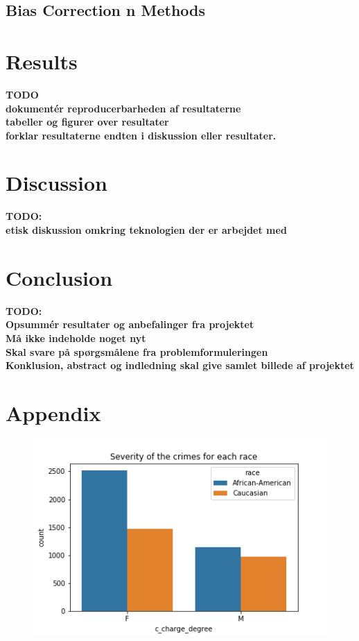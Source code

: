 \documentclass[11pt, fleqn, titlepage]{article}
\begin{document}
	\subsection{Bias Correction	n Methods}
	
	\section{Results}
	\textbf{TODO \\ dokumentér reproducerbarheden af resultaterne \\ tabeller og figurer over resultater \\ forklar resultaterne endten i diskussion eller resultater.}
	
	\section{Discussion} \label{discussion}
	\textbf{TODO: \\ etisk diskussion omkring teknologien der er arbejdet med}
	
	\section{Conclusion}
	\textbf{TODO: \\ Opsummér resultater og anbefalinger fra projektet \\ Må ikke indeholde noget nyt \\ Skal svare på spørgsmålene fra problemformuleringen \\ Konklusion, abstract og indledning skal give samlet billede af projektet}
	
	\section{Appendix}
	
	\begin{figure}[H]
		\centering
		\includegraphics[width=0.5\linewidth]{imgs/c_charge_degree}
		\caption{}
		\label{fig:cchargedegree}
	\end{figure}
	
\end{document}
